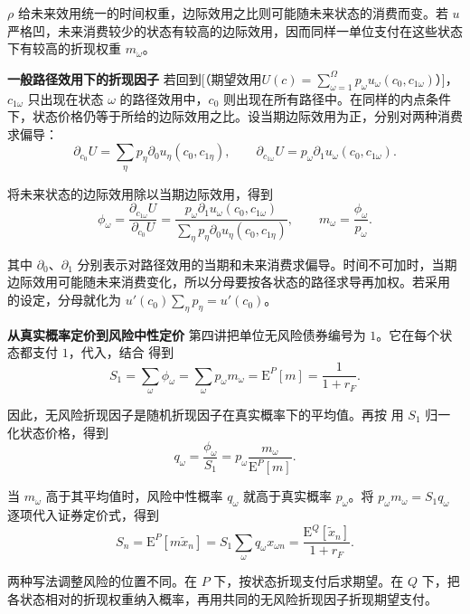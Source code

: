 $\rho$ 给未来效用统一的时间权重，边际效用之比则可能随未来状态的消费而变。若 $u$ 严格凹，未来消费较少的状态有较高的边际效用，因而同样一单位支付在这些状态下有较高的折现权重 $m_\omega$。

\textbf{一般路径效用下的折现因子}\quad
若回到[（期望效用$U(c)=\sum_{\omega=1}^{\Omega}p_\omega u_\omega(c_0,c_{1\omega})$）]，$c_{1\omega}$ 只出现在状态 $\omega$ 的路径效用中，$c_0$ 则出现在所有路径中。在同样的内点条件下，状态价格仍等于所给的边际效用之比。设当期边际效用为正，分别对两种消费求偏导：
\[
 \partial_{c_0}U=\sum_\eta p_\eta\partial_0u_\eta(c_0,c_{1\eta}),
 \qquad
 \partial_{c_{1\omega}}U=p_\omega\partial_1u_\omega(c_0,c_{1\omega}).
\]

将未来状态的边际效用除以当期边际效用，得到
\[
 \phi_\omega=\frac{\partial_{c_{1\omega}}U}{\partial_{c_0}U}
 =\frac{p_\omega\partial_1u_\omega(c_0,c_{1\omega})}
        {\sum_\eta p_\eta\partial_0u_\eta(c_0,c_{1\eta})},
 \qquad m_\omega=\frac{\phi_\omega}{p_\omega}.
\]

其中 $\partial_0$、$\partial_1$ 分别表示对路径效用的当期和未来消费求偏导。时间不可加时，当期边际效用可能随未来消费变化，所以分母要按各状态的路径求导再加权。若采用 的设定，分母就化为 $u'(c_0)\sum_\eta p_\eta=u'(c_0)$。


\textbf{从真实概率定价到风险中性定价}\quad
第四讲把单位无风险债券编号为 $1$。它在每个状态都支付 $1$，代入，结合 得到
\[
 S_1=\sum_\omega\phi_\omega
    =\sum_\omega p_\omega m_\omega
    =\mathrm E^P[m]
    =\frac{1}{1+r_F}.
\]

因此，无风险折现因子是随机折现因子在真实概率下的平均值。再按 用 $S_1$ 归一化状态价格，得到
\[
 q_\omega=\frac{\phi_\omega}{S_1}
          =p_\omega\frac{m_\omega}{\mathrm E^P[m]}.
\]

当 $m_\omega$ 高于其平均值时，风险中性概率 $q_\omega$ 就高于真实概率 $p_\omega$。将 $p_\omega m_\omega=S_1q_\omega$ 逐项代入证券定价式，得到
\[
 S_n=\mathrm E^P[m\tilde x_n]
    =S_1\sum_\omega q_\omega x_{\omega n}
    =\frac{\mathrm E^Q[\tilde x_n]}{1+r_F}.
\]

两种写法调整风险的位置不同。在 $P$ 下，按状态折现支付后求期望。在 $Q$ 下，把各状态相对的折现权重纳入概率，再用共同的无风险折现因子折现期望支付。


